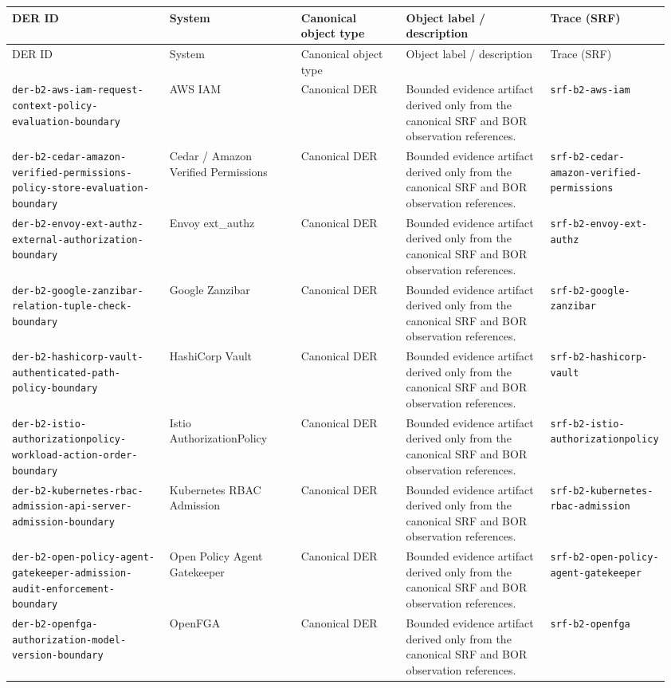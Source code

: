 \begin{center}
\begin{longtable}{@{}p{0.24\linewidth}p{0.20\linewidth}p{0.16\linewidth}p{0.22\linewidth}p{0.14\linewidth}@{}}
\toprule
DER ID & System & Canonical object type & Object label / description & Trace (SRF) \\
\midrule
\endfirsthead
\toprule
DER ID & System & Canonical object type & Object label / description & Trace (SRF) \\
\midrule
\endhead
\bottomrule
\endfoot
\bottomrule
\endlastfoot
\texttt{der-b2-aws-iam-request-context-policy-evaluation-boundary} & AWS IAM & Canonical DER & Bounded evidence artifact derived only from the canonical SRF and BOR observation references. & \texttt{srf-b2-aws-iam} \\
\texttt{der-b2-cedar-amazon-verified-permissions-policy-store-evaluation-boundary} & Cedar / Amazon Verified Permissions & Canonical DER & Bounded evidence artifact derived only from the canonical SRF and BOR observation references. & \texttt{srf-b2-cedar-amazon-verified-permissions} \\
\texttt{der-b2-envoy-ext-authz-external-authorization-boundary} & Envoy ext\_authz & Canonical DER & Bounded evidence artifact derived only from the canonical SRF and BOR observation references. & \texttt{srf-b2-envoy-ext-authz} \\
\texttt{der-b2-google-zanzibar-relation-tuple-check-boundary} & Google Zanzibar & Canonical DER & Bounded evidence artifact derived only from the canonical SRF and BOR observation references. & \texttt{srf-b2-google-zanzibar} \\
\texttt{der-b2-hashicorp-vault-authenticated-path-policy-boundary} & HashiCorp Vault & Canonical DER & Bounded evidence artifact derived only from the canonical SRF and BOR observation references. & \texttt{srf-b2-hashicorp-vault} \\
\texttt{der-b2-istio-authorizationpolicy-workload-action-order-boundary} & Istio AuthorizationPolicy & Canonical DER & Bounded evidence artifact derived only from the canonical SRF and BOR observation references. & \texttt{srf-b2-istio-authorizationpolicy} \\
\texttt{der-b2-kubernetes-rbac-admission-api-server-admission-boundary} & Kubernetes RBAC Admission & Canonical DER & Bounded evidence artifact derived only from the canonical SRF and BOR observation references. & \texttt{srf-b2-kubernetes-rbac-admission} \\
\texttt{der-b2-open-policy-agent-gatekeeper-admission-audit-enforcement-boundary} & Open Policy Agent Gatekeeper & Canonical DER & Bounded evidence artifact derived only from the canonical SRF and BOR observation references. & \texttt{srf-b2-open-policy-agent-gatekeeper} \\
\texttt{der-b2-openfga-authorization-model-version-boundary} & OpenFGA & Canonical DER & Bounded evidence artifact derived only from the canonical SRF and BOR observation references. & \texttt{srf-b2-openfga} \\
\end{longtable}
\end{center}


